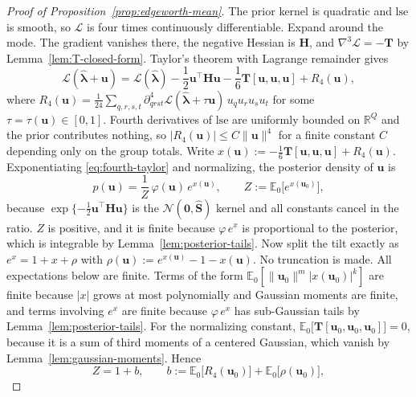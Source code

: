 \begin{proof}[Proof of Proposition~\ref{prop:edgeworth-mean}]
The prior kernel is quadratic and $\mathrm{lse}$ is smooth, so $\mathcal{L}$ is four times continuously differentiable. Expand around the mode. The gradient vanishes there, the negative Hessian is $\mathbf{H}$, and $\nabla^{3}\mathcal{L}=-\mathbf{T}$ by Lemma~\ref{lem:T-closed-form}. Taylor's theorem with Lagrange remainder gives
\begin{equation}
    \mathcal{L}(\hat{\bm{\lambda}}+\bm{u})=\mathcal{L}(\hat{\bm{\lambda}})-\frac{1}{2}\bm{u}^{\top}\mathbf{H}\bm{u}-\frac{1}{6}\mathbf{T}[\bm{u},\bm{u},\bm{u}]+R_{4}(\bm{u}),
    \label{eq:fourth-taylor}
\end{equation}
where $R_{4}(\bm{u})=\frac{1}{24}\sum_{q,r,s,t}\partial^{4}_{qrst}\mathcal{L}(\hat{\bm{\lambda}}+\tau\bm{u})\,u_{q}u_{r}u_{s}u_{t}$ for some $\tau=\tau(\bm{u})\in[0,1]$. Fourth derivatives of $\mathrm{lse}$ are uniformly bounded on $\mathbb{R}^{Q}$ and the prior contributes nothing, so $|R_{4}(\bm{u})|\leq C\|\bm{u}\|^{4}$ for a finite constant $C$ depending only on the group totals. Write $x(\bm{u}):=-\frac{1}{6}\mathbf{T}[\bm{u},\bm{u},\bm{u}]+R_{4}(\bm{u})$. Exponentiating \eqref{eq:fourth-taylor} and normalizing, the posterior density of $\bm{u}$ is
\begin{equation}
    p(\bm{u})=\frac{1}{Z}\,\varphi(\bm{u})\,e^{x(\bm{u})},\qquad Z:=\mathbb{E}_{0}\big[e^{x(\bm{u}_{0})}\big],
    \label{eq:posterior-tilt}
\end{equation}
because $\exp\{-\frac{1}{2}\bm{u}^{\top}\mathbf{H}\bm{u}\}$ is the $\mathcal{N}(\bm{0},\hat{\mathbf{S}})$ kernel and all constants cancel in the ratio. $Z$ is positive, and it is finite because $\varphi\,e^{x}$ is proportional to the posterior, which is integrable by Lemma~\ref{lem:posterior-tails}. Now split the tilt exactly as $e^{x}=1+x+\rho$ with $\rho(\bm{u}):=e^{x(\bm{u})}-1-x(\bm{u})$. No truncation is made. All expectations below are finite. Terms of the form $\mathbb{E}_{0}[\|\bm{u}_{0}\|^{m}|x(\bm{u}_{0})|^{k}]$ are finite because $|x|$ grows at most polynomially and Gaussian moments are finite, and terms involving $e^{x}$ are finite because $\varphi\,e^{x}$ has sub-Gaussian tails by Lemma~\ref{lem:posterior-tails}. For the normalizing constant, $\mathbb{E}_{0}\big[\mathbf{T}[\bm{u}_{0},\bm{u}_{0},\bm{u}_{0}]\big]=0$, because it is a sum of third moments of a centered Gaussian, which vanish by Lemma~\ref{lem:gaussian-moments}. Hence
\begin{equation}
    Z=1+b,\qquad b:=\mathbb{E}_{0}\big[R_{4}(\bm{u}_{0})\big]+\mathbb{E}_{0}\big[\rho(\bm{u}_{0})\big],

\end{equation}
\end{proof}
